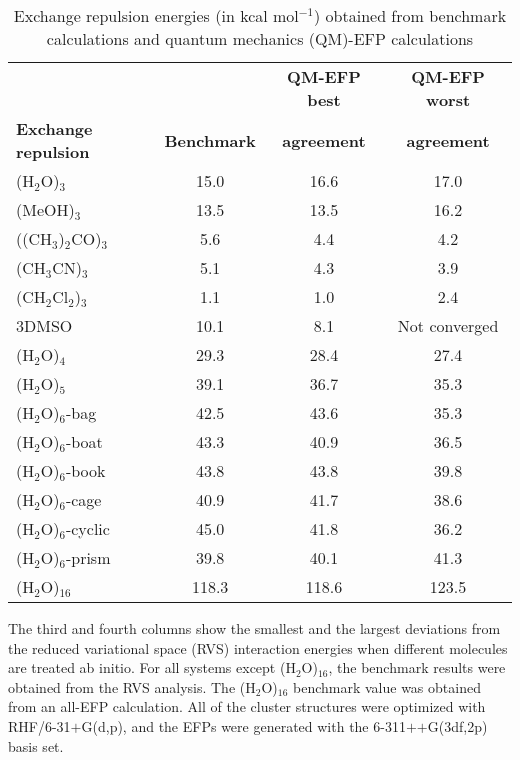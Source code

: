 \documentclass{ar-1col}
\begin{document}
\begin{table}
\caption{Exchange repulsion energies (in kcal mol$^{-1}$) obtained from benchmark calculations and quantum mechanics (QM)-EFP calculations}
\label{tab2}
\begin{center}
\begin{tabular}{@{}l|c|c|c@{}}
\hline
&&{\bf QM-EFP best} &{\bf QM-EFP worst}\\
{\bf Exchange repulsion} &{\bf Benchmark} &{\bf agreement} &{\bf agreement}\\
\hline
(H$_2$O)$_3$ &15.0 &16.6 &17.0\\
\hline
(MeOH)$_3$ &13.5 &13.5 &16.2\\
\hline
((CH$_3$)$_2$CO)$_3$ &5.6 &4.4 &4.2\\
\hline
(CH$_3$CN)$_3$ &5.1 &4.3 &3.9\\
\hline
(CH$_2$Cl$_2$)$_3$ &1.1 &1.0 &2.4\\
\hline
3DMSO &10.1 &8.1 &Not converged\\
\hline
(H$_2$O)$_4$ &29.3 &28.4 &27.4\\
\hline
(H$_2$O)$_5$ &39.1 &36.7 &35.3\\
\hline
(H$_2$O)$_6$-bag &42.5 &43.6 &35.3\\
\hline
(H$_2$O)$_6$-boat &43.3 &40.9 &36.5\\
\hline
(H$_2$O)$_6$-book &43.8 &43.8 &39.8\\
\hline
(H$_2$O)$_6$-cage &40.9 &41.7 &38.6\\
\hline
(H$_2$O)$_6$-cyclic &45.0 &41.8 &36.2\\
\hline
(H$_2$O)$_6$-prism &39.8 &40.1 &41.3\\
\hline
(H$_2$O)$_{16}$ &118.3 &118.6 &123.5\\
\hline
\end{tabular}
\end{center}
\begin{tabnote}
The third and fourth columns show the smallest and the largest deviations from the reduced variational space (RVS) interaction energies when different molecules are treated ab initio. For all systems except (H$_2$O)$_{16}$, the benchmark results were obtained from the RVS analysis. The (H$_2$O)$_{16}$ benchmark value was obtained from an all-EFP calculation. All of the cluster structures were optimized with RHF/6-31$+$G(d,p), and the EFPs were generated with the 6-311$+$$+$G(3df,2p) basis set.
\end{tabnote}
\end{table}
\end{document}
